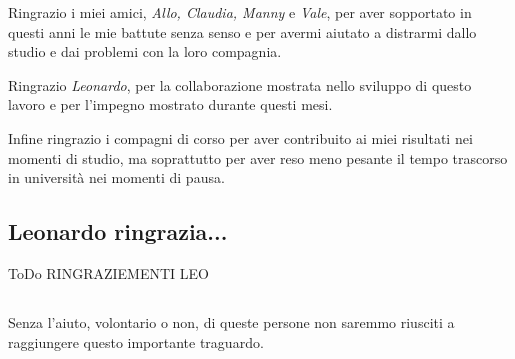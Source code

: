 Ringrazio i miei amici, \textit{Allo, Claudia, Manny} e \textit{Vale}, per aver sopportato in questi anni le mie battute senza senso e per avermi aiutato a distrarmi dallo studio e dai problemi con la loro compagnia.

Ringrazio \textit{Leonardo}, per la collaborazione mostrata nello sviluppo di questo lavoro e per l'impegno mostrato durante questi mesi.

Infine ringrazio i compagni di corso per aver contribuito ai miei risultati nei momenti di studio, ma soprattutto per aver reso meno pesante il tempo trascorso in università nei momenti di pausa.

\subsection*{Leonardo ringrazia...}
ToDo RINGRAZIEMENTI LEO
\subsection*{}
Senza l'aiuto, volontario o non, di queste persone non saremmo riusciti a raggiungere questo importante traguardo.
